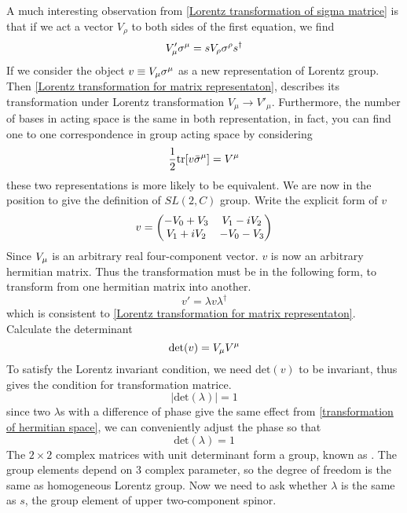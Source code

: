 A much interesting observation from \eqref{Lorentz transformation of sigma matrice} is that if we act a vector $V_{\rho}$ to both sides of the first equation, we find
\begin{equation} \label{Lorentz transformation for matrix representaton}
  V'_{\mu}\sigma^{\mu} = s V_{\rho}\sigma^{\rho}{s}^{\dagger}
\end{equation}
If we consider the object $v\equiv V_\mu \sigma^{\mu}$ as a new representation of Lorentz group. Then \eqref{Lorentz transformation for matrix representaton}, describes its transformation under Lorentz transformation $V_{\mu}\rightarrow V'_{\mu}$.
Furthermore, the number of bases in acting space is the same in both representation, in fact, you can find one to one correspondence in group acting space by considering
\begin{equation} \label{reflection to the vector representation}
\frac{1}{2} \text{tr}[v\bar{\sigma}^{\mu}] = V^{\mu}
\end{equation}
these two representations is more likely to be equivalent.
We are now in the position to give the definition of $SL(2,C)$ group. Write the explicit form of $v$
\begin{equation}
  v = \mqty(-V_0 +  V_3 & V_1 - i V_2
                \\ V_1 +i V_2 & -V_0 -  V_3)
\end{equation}
Since $V_{\mu}$ is an arbitrary real four-component vector.  $v$ is now an arbitrary hermitian matrix. Thus the transformation must be in the following form, to transform from one hermitian matrix into another.
\begin{equation} \label{transformation of hermitian space}
v' = \lambda v \lambda^{\dagger}
\end{equation}
which is consistent to \eqref{Lorentz transformation for matrix representaton}. Calculate the determinant
\begin{equation}
  \text{det}(v) = V_\mu V^\mu
\end{equation}
To satisfy the Lorentz invariant condition, we need $\text{det}(v)$ to be invariant, thus gives the condition for transformation matrice.
\begin{equation}
  |\text{det}(\lambda)| = 1
\end{equation}
since two $\lambda$s with a difference of phase give the same effect from \eqref{transformation of hermitian space}, we can conveniently adjust the phase so that
\begin{equation} \label{SL(2,C) condition}
\text{det}(\lambda) = 1
\end{equation}
The $2\times2$ complex matrices with unit determinant form a group, known as . The group elements depend on 3 complex parameter, so the degree of freedom is the same as homogeneous Lorentz group. Now we need to ask whether $\lambda$ is the same as $s$, the group element of upper two-component spinor.


